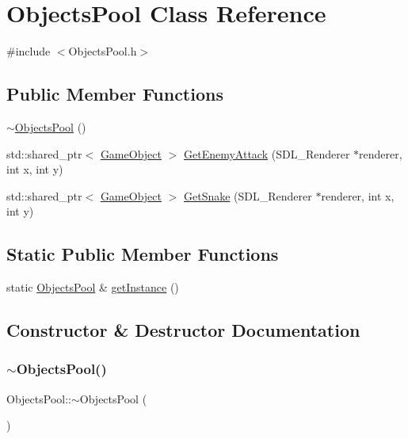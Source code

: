 \hypertarget{class_objects_pool}{}\section{Objects\+Pool Class Reference}
\label{class_objects_pool}


{\ttfamily \#include $<$Objects\+Pool.\+h$>$}

\subsection*{Public Member Functions}
\begin{DoxyCompactItemize}
\item 
\mbox{\hyperlink{class_objects_pool_a0895698090f1d06cefc290b51bcd6197}{$\sim$\+Objects\+Pool}} ()
\item 
std\+::shared\+\_\+ptr$<$ \mbox{\hyperlink{class_game_object}{Game\+Object}} $>$ \mbox{\hyperlink{class_objects_pool_a0cb6ec80efacce659b008ab8bc000aa9}{Get\+Enemy\+Attack}} (S\+D\+L\+\_\+\+Renderer $\ast$renderer, int x, int y)
\item 
std\+::shared\+\_\+ptr$<$ \mbox{\hyperlink{class_game_object}{Game\+Object}} $>$ \mbox{\hyperlink{class_objects_pool_a97601dd9984711e20f2f9984a51a1741}{Get\+Snake}} (S\+D\+L\+\_\+\+Renderer $\ast$renderer, int x, int y)
\end{DoxyCompactItemize}
\subsection*{Static Public Member Functions}
\begin{DoxyCompactItemize}
\item 
static \mbox{\hyperlink{class_objects_pool}{Objects\+Pool}} \& \mbox{\hyperlink{class_objects_pool_aca7dadcb65812523bc0f910cf8183884}{get\+Instance}} ()
\end{DoxyCompactItemize}


\subsection{Constructor \& Destructor Documentation}
\mbox{\label{class_objects_pool_a0895698090f1d06cefc290b51bcd6197}} 
\subsubsection{\texorpdfstring{$\sim$\+Objects\+Pool()}{~ObjectsPool()}}
{\footnotesize\ttfamily Objects\+Pool\+::$\sim$\+Objects\+Pool (\begin{DoxyParamCaption}{ }\end{DoxyParamCaption})}



